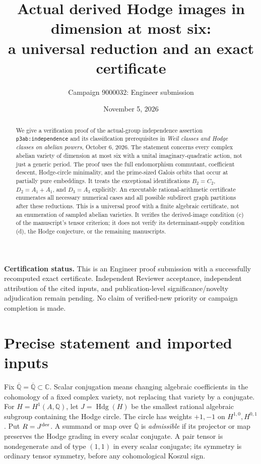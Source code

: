 \documentclass[11pt]{article}
\title{Actual derived Hodge images in dimension at most six:\\
a universal reduction and an exact certificate}
\author{Campaign 9000032: Engineer submission}
\date{November 5, 2026}
\newcommand{\Q}{\mathbb Q}
\newcommand{\C}{\mathbb C}
\newcommand{\kk}{{\overline{\mathbb Q}}}
\DeclareMathOperator{\Hg}{Hdg}
\theoremstyle{remark}
\begin{document}
\maketitle

\begin{abstract}
We give a verification proof of the actual-group independence assertion
\texttt{p3ab:independence} and its classification prerequisites in
\emph{Weil classes and Hodge classes on abelian powers}, October 6, 2026.
The statement concerns every complex abelian variety of dimension at most
six with a unital imaginary-quadratic action, not just a generic period.
The proof uses the full endomorphism commutant, coefficient descent,
Hodge-circle minimality, and the prime-sized Galois orbits that occur at
partially pure embeddings. It treats the exceptional identifications
$B_2=C_2$, $D_2=A_1+A_1$, and $D_3=A_3$ explicitly.
An executable rational-arithmetic certificate enumerates all necessary
numerical cases and all possible subdirect graph partitions after these
reductions. This is a universal proof with a finite algebraic certificate,
not an enumeration of sampled abelian varieties.
It verifies the derived-image condition (c) of the manuscript's tensor
criterion; it does not verify its determinant-supply condition (d), the
Hodge conjecture, or the remaining manuscripts.
\end{abstract}

\noindent\textbf{Certification status.}
This is an Engineer proof submission with a successfully recomputed exact
certificate. Independent Reviewer acceptance, independent attribution of
the cited inputs, and publication-level significance/novelty adjudication
remain pending. No claim of verified-new priority or campaign completion
is made.

\section{Precise statement and imported inputs}

Fix $\kk=\overline{\Q}\subset\C$. Scalar conjugation means changing
algebraic coefficients in the cohomology of a fixed complex variety, not
replacing that variety by a conjugate. For $H=H^1(A,\Q)$, let
$J=\Hg(H)$ be the smallest rational algebraic subgroup containing the
Hodge circle. The circle has weights $+1,-1$ on $H^{1,0},H^{0,1}$.
Put $R=J^{\rm der}$. A summand or map over $\kk$ is
\emph{admissible} if its projector or map preserves the Hodge grading in
every scalar conjugate. A pair tensor is nondegenerate and of type
$(1,1)$ in every scalar conjugate; its symmetry is ordinary tensor
symmetry, before any cohomological Koszul sign.
\end{document}
